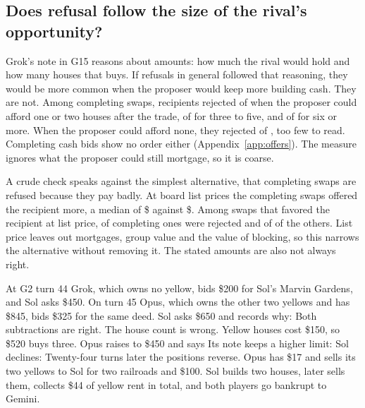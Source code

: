 \subsection{Does refusal follow the size of the rival's opportunity?}
Grok's note in G15 reasons about amounts: how much the rival would hold and how many houses that buys. If refusals in general followed that reasoning, they would be more common when the proposer would keep more building cash. They are not. Among completing swaps, recipients rejected  of  when the proposer could afford one or two houses after the trade,  of  for three to five, and  of  for six or more. When the proposer could afford none, they rejected  of , too few to read. Completing cash bids show no order either (Appendix~\ref{app:offers}). The measure ignores what the proposer could still mortgage, so it is coarse.

A crude check speaks against the simplest alternative, that completing swaps are refused because they pay badly. At board list prices the completing swaps offered the recipient more, a median of \$ against \$. Among swaps that favored the recipient at list price,  of  completing ones were rejected and  of  of the others. List price leaves out mortgages, group value and the value of blocking, so this narrows the alternative without removing it. The stated amounts are also not always right.

At G2 turn 44 Grok, which owns no yellow, bids \$200 for Sol's Marvin Gardens, and Sol asks \$450. On turn 45 Opus, which owns the other two yellows and has \$845, bids \$325 for the same deed. Sol asks \$650 and records why:
Both subtractions are right. The house count is wrong. Yellow houses cost \$150, so \$520 buys three. Opus raises to \$450 and says  Its note keeps a higher limit:  Sol declines:
Twenty-four turns later the positions reverse. Opus has \$17 and sells its two yellows to Sol for two railroads and \$100. Sol builds two houses, later sells them, collects \$44 of yellow rent in total, and both players go bankrupt to Gemini.

